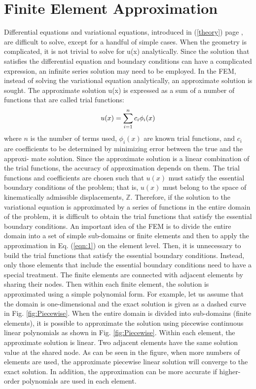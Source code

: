 \section{Finite Element Approximation \parencite{ref4}}
Differential equations and variational equations, introduced in (\ref{theory}) page \pageref{theory},
are difficult to solve, except for a handful of simple cases. When the geometry is
complicated, it is not trivial to solve for u(x) analytically. Since the solution that
satisfies the differential equation and boundary conditions can have a complicated
expression, an infinite series solution may need to be employed. In the FEM, instead
of solving the variational equation analytically, an approximate solution is sought.
The approximate solution u(x) is expressed as a sum of a number of functions that
are called trial functions:
\begin{equation}
\label{eqn:1}
u(x) = \sum\limits_{i = 1}^n {{c_i}} {\phi _i}(x){\rm{ }}
\end{equation}
where $n$ is the number of terms used, $\phi_i(x)$ are known trial functions, and $c_i$ are
coefficients to be determined by minimizing error between the true and the approxi-
mate solution. Since the approximate solution is a linear combination of the trial
functions, the accuracy of approximation depends on them.
\vspace{0.38cm}
\newline
The trial functions and coefficients are chosen such that $u(x)$ must satisfy the
essential boundary conditions of the problem; that is, $u(x)$ must belong to the
space of kinematically admissible displacements, $\mathbb{Z}$. Therefore, if the solution to
the variational equation is approximated by a series of functions in the entire domain
of the problem, it is difficult to obtain the trial functions that satisfy the essential
boundary conditions. An important idea of the FEM is to divide the entire domain
into a set of simple sub-domains or finite elements and then to apply the approximation 
in Eq. (\ref{eqn:1}) on the element level. Then, it is unnecessary to build the trial
functions that satisfy the essential boundary conditions. Instead, only those elements
that include the essential boundary conditions need to have a special treatment.
The finite elements are connected with adjacent elements by sharing their nodes.
Then within each finite element, the solution is approximated using a simple
polynomial form. For example, let us assume that the domain is one-dimensional
and the exact solution is given as a dashed curve in Fig. \ref{fig:Piecewise}. When the entire domain is divided into sub-domains (finite elements), it is possible to approximate the
solution using piecewise continuous linear polynomials as shown in Fig. \ref{fig:Piecewise}.
Within each element, the approximate solution is linear. Two adjacent elements
have the same solution value at the shared node. As can be seen in the figure, when
more numbers of elements are used, the approximate piecewise linear solution will
converge to the exact solution. In addition, the approximation can be more accurate
if higher-order polynomials are used in each element.\\


